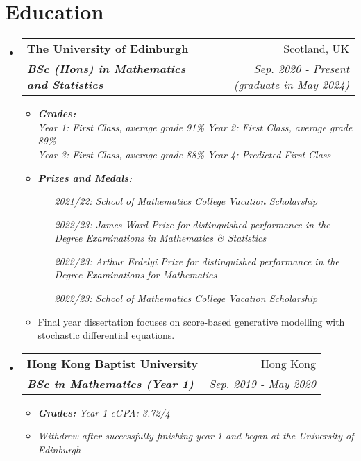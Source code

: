 \documentclass[12pt, a4paper]{article}
\makeatletter
\newcommand{\resumeSection}[1]{
    \section*{#1}
}
\newcommand{\resumeSectionItm}[4]{
\item
    \begin{tabular*}{0.96\textwidth}{@{}l@{\extracolsep{\fill}}r@{}}
        \textbf{#1} & #2 \\
        \textit{\textbf{#3}} & \textit{#4}
    \end{tabular*}
}
\makeatother
\begin{document}
\resumeSection{Education}
\begin{itemize}[leftmargin=*]
    \resumeSectionItm
    {The University of Edinburgh}{Scotland, UK}
    {BSc (Hons) in Mathematics and Statistics}{Sep. 2020 - Present
    (graduate in May 2024)}
    \begin{itemize}[leftmargin=*]
        \vspace{-1mm}
        \item \it{\textbf{Grades:}}\\
            \it{Year 1: First Class, average grade 91\%}
            \hspace{5mm}\it{Year 2: First Class, average grade 89\%}\\
            \it{Year 3: First Class, average grade 88\%}
            \hspace{5mm}\it{Year 4: Predicted First Class}
        \item \it{\textbf{Prizes and Medals:}}
            \begin{itemize}[
                align=left,
                leftmargin=4em,
                itemindent=0.5pt,
                labelsep=0pt,
                labelwidth=4em
                ]
                \item [\it{2021/22:}]
                    \it{School of Mathematics College Vacation Scholarship}
                \item [\it{2022/23:}]
                    \it{James Ward Prize for distinguished performance in the
                        Degree Examinations in Mathematics \& Statistics}
                \item [\it{2022/23:}]
                    \it{Arthur Erdelyi Prize for distinguished
                    performance in the Degree Examinations for Mathematics}
                \item [\it{2022/23:}]
                    \it{School of Mathematics College Vacation Scholarship}
            \end{itemize}
        \item Final year dissertation focuses on score-based generative
            modelling with stochastic differential equations.
    \end{itemize}
\end{itemize}
\vspace{-5.5mm}
\begin{itemize}[leftmargin=*]
    \resumeSectionItm
    {Hong Kong Baptist University}{Hong Kong}
    {BSc in Mathematics (Year 1)}{Sep. 2019 - May 2020}
    \vspace{-1.5mm}
    \begin{itemize}[leftmargin=*]
        \item \it{\textbf{Grades:}}
            \textit{Year 1 cGPA: 3.72/4}
        \footnotesize \item \textit{\footnotesize Withdrew after successfully
            finishing year 1 and began at the University of Edinburgh}
    \end{itemize}
\end{itemize}
\vspace{-4mm}
\end{document}
